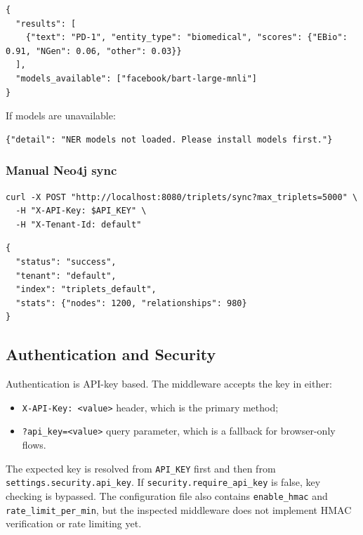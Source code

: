 \documentclass[10pt,letterpaper]{article}
\begin{document}
\begin{Verbatim}[fontsize=\scriptsize,breaklines=true,breakanywhere=true]
{
  "results": [
    {"text": "PD-1", "entity_type": "biomedical", "scores": {"EBio": 0.91, "NGen": 0.06, "other": 0.03}}
  ],
  "models_available": ["facebook/bart-large-mnli"]
}
\end{Verbatim}

If models are unavailable:

\begin{Verbatim}[fontsize=\scriptsize,breaklines=true,breakanywhere=true]
{"detail": "NER models not loaded. Please install models first."}
\end{Verbatim}

\subsubsection{Manual Neo4j sync}

\begin{Verbatim}[fontsize=\scriptsize,breaklines=true,breakanywhere=true]
curl -X POST "http://localhost:8080/triplets/sync?max_triplets=5000" \
  -H "X-API-Key: $API_KEY" \
  -H "X-Tenant-Id: default"
\end{Verbatim}

\begin{Verbatim}[fontsize=\scriptsize,breaklines=true,breakanywhere=true]
{
  "status": "success",
  "tenant": "default",
  "index": "triplets_default",
  "stats": {"nodes": 1200, "relationships": 980}
}
\end{Verbatim}


\subsection{Authentication and Security}

Authentication is API-key based. The middleware accepts the key in either:

\begin{itemize}
\item \texttt{X-API-Key: <value>} header, which is the primary method;
\item \texttt{?api\_key=<value>} query parameter, which is a fallback for browser-only flows.
\end{itemize}

The expected key is resolved from \texttt{API\_KEY} first and then from \texttt{settings.security.api\_key}. If \texttt{security.require\_api\_key} is false, key checking is bypassed. The configuration file also contains \texttt{enable\_hmac} and \texttt{rate\_limit\_per\_min}, but the inspected middleware does not implement HMAC verification or rate limiting yet.
\end{document}
